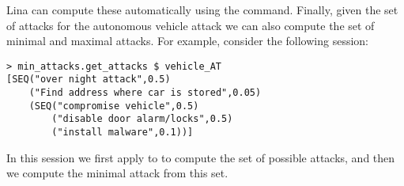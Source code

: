 Lina can compute these automatically using the 
command.  Finally, given the set of attacks for the autonomous vehicle
attack we can also compute the set of minimal and maximal attacks.
For example, consider the following session:
\begin{mdframed}
  \scriptsize
  \begin{verbatim}
> min_attacks.get_attacks $ vehicle_AT
[SEQ("over night attack",0.5)
	("Find address where car is stored",0.05)
	(SEQ("compromise vehicle",0.5)
		("disable door alarm/locks",0.5)
		("install malware",0.1))]
  \end{verbatim}
\end{mdframed}
In this session we first apply  to  to
compute the set of possible attacks, and then we compute the minimal
attack from this set.


